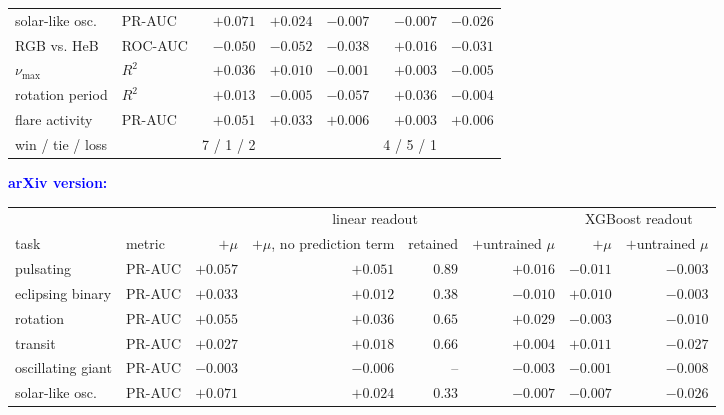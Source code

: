 \documentclass{article}
\providecommand{\DIFaddbeginFL}{} %
\providecommand{\DIFdelendFL}{} %
\providecommand{\DIFaddincludegraphics}[2][]{{\color{blue}\fbox{\DIFOincludegraphics[#1]{#2}}}} %
\DeclareRobustCommand{\DIFaddbeginFL}{\DIFOaddbeginFL \let\includegraphics\DIFaddincludegraphics} %
\DeclareRobustCommand{\DIFdelendFL}{\DIFOaddendFL \let\includegraphics\DIFOincludegraphics} %
\begin{document}
\begin{table}[H]
\begin{tabular}{llrrrrr}
solar-like osc. & PR-AUC & $\boldsymbol{+}\mathbf{0.071}$ & $\boldsymbol{+}\mathbf{0.024}$ & ${-}0.007$ & ${-}0.007$ & ${-}0.026$ \\
RGB vs. HeB & ROC-AUC & $\boldsymbol{-}\mathbf{0.050}$ & $\boldsymbol{-}\mathbf{0.052}$ & ${-}0.038$ & $\boldsymbol{+}\mathbf{0.016}$ & ${-}0.031$ \\
$\nu_{\max}$ & $R^2$ & $\boldsymbol{+}\mathbf{0.036}$ & $\boldsymbol{+}\mathbf{0.010}$ & ${-}0.001$ & $\boldsymbol{+}\mathbf{0.003}$ & ${-}0.005$ \\
rotation period & $R^2$ & $\boldsymbol{+}\mathbf{0.013}$ & ${-}0.005$ & ${-}0.057$ & $\boldsymbol{+}\mathbf{0.036}$ & ${-}0.004$ \\
flare activity & PR-AUC & $\boldsymbol{+}\mathbf{0.051}$ & $\boldsymbol{+}\mathbf{0.033}$ & ${+}0.006$ & ${+}0.003$ & ${+}0.006$ \\
\midrule
win / tie / loss & & 7 / 1 / 2 & & & 4 / 5 / 1 & \\
\bottomrule
\end{tabular}
\endgroup\par\medskip
{\scriptsize\textcolor{blue}{\textbf{arXiv version:}}}\par\nobreak\smallskip
\DIFdelendFL \DIFaddbeginFL \begin{tabular}{llrrrrrr}
\toprule
 & & \multicolumn{4}{c}{linear readout} & \multicolumn{2}{c}{XGBoost readout} \\
\cmidrule(lr){3-6}\cmidrule(lr){7-8}
task & metric & $+\mu$ & $+\mu$, no prediction term & retained & $+$untrained $\mu$ & $+\mu$ & $+$untrained $\mu$ \\
\midrule
pulsating & PR-AUC & $\boldsymbol{+}\mathbf{0.057}$ & $\boldsymbol{+}\mathbf{0.051}$ & $0.89$ & ${+}0.016$ & ${-}0.011$ & ${-}0.003$ \\
eclipsing binary & PR-AUC & $\boldsymbol{+}\mathbf{0.033}$ & $\boldsymbol{+}\mathbf{0.012}$ & $0.38$ & ${-}0.010$ & $\boldsymbol{+}\mathbf{0.010}$ & ${-}0.003$ \\
rotation & PR-AUC & $\boldsymbol{+}\mathbf{0.055}$ & $\boldsymbol{+}\mathbf{0.036}$ & $0.65$ & ${+}0.029$ & $\boldsymbol{-}\mathbf{0.003}$ & ${-}0.010$ \\
transit & PR-AUC & $\boldsymbol{+}\mathbf{0.027}$ & $\boldsymbol{+}\mathbf{0.018}$ & $0.66$ & ${+}0.004$ & ${+}0.011$ & ${-}0.027$ \\
oscillating giant & PR-AUC & $\boldsymbol{-}\mathbf{0.003}$ & $\boldsymbol{-}\mathbf{0.006}$ & -- & ${-}0.003$ & ${-}0.001$ & ${-}0.008$ \\
solar-like osc. & PR-AUC & $\boldsymbol{+}\mathbf{0.071}$ & $\boldsymbol{+}\mathbf{0.024}$ & $0.33$ & ${-}0.007$ & ${-}0.007$ & ${-}0.026$ \\

\end{tabular}
\end{table}
\end{document}
